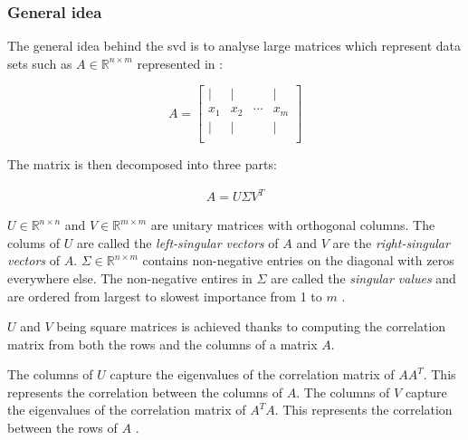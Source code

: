 



\subsubsection{General idea}

The general idea behind the \gls{svd} is to analyse large matrices which represent data sets such as  $A \in \mathbb{R}^{n \times m}$ represented in :

\begin{equation}
	\label{formula:svdMatrixShape}
	A = 
	\begin{bmatrix}
		\mid & \mid & & \mid\\
		x_1 & x_2 & \cdots & x_m\\
		\mid & \mid & & \mid\\
	\end{bmatrix}
\end{equation}

\vspace*{4mm}

The matrix is then decomposed into three parts:

\vspace{-6mm}
\begin{align}
	\label{formula:svdBasic}
	A = U \Sigma V^T
\end{align}

$U \in \mathbb{R}^{n \times n}$ and $V \in \mathbb{R}^{m \times m}$ are unitary matrices with orthogonal columns.
The colums of $U$ are called the \emph{left-singular vectors} of $A$ and $V$ are the \emph{right-singular vectors} of $A$.
$\Sigma \in \mathbb{R}^{n \times m}$ contains non-negative entries on the diagonal with zeros everywhere else.
The non-negative entires in $\Sigma$ are called the \emph{singular values} and are ordered from largest to slowest importance from 1 to $m$ \cite{brunton2019data}.
\bigskip


$U$ and $V$ being square matrices is achieved thanks to computing the correlation matrix from both the rows and the columns of a matrix $A$.

The columns of $U$ capture the eigenvalues of the correlation matrix of $AA^T$.
This represents the correlation between the columns of $A$.
The columns of $V$ capture the eigenvalues of the correlation matrix of $A^TA$.
This represents the correlation between the rows of $A$ \cite{brunton2019data}.  %
\bigskip


